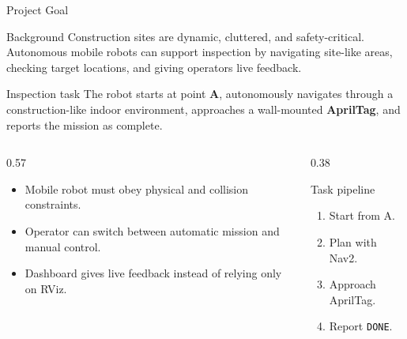 \documentclass[aspectratio=169,11pt]{beamer}
\newcommand{\topic}[1]{\textcolor{siteblue}{\textbf{#1}}}
\begin{document}
\begin{frame}{Project Goal}
  \small
  \begin{block}{Background}
    Construction sites are dynamic, cluttered, and safety-critical. Autonomous mobile robots can support inspection by navigating site-like areas, checking target locations, and giving operators live feedback.
  \end{block}

  \begin{block}{Inspection task}
    The robot starts at point \topic{A}, autonomously navigates through a construction-like indoor environment, approaches a wall-mounted \topic{AprilTag}, and reports the mission as complete.
  \end{block}

  \vspace{-0.25em}
  \begin{columns}[T,onlytextwidth]
    \begin{column}{0.57\textwidth}
      \begin{itemize}
        \item Mobile robot must obey physical and collision constraints.
        \item Operator can switch between automatic mission and manual control.
        \item Dashboard gives live feedback instead of relying only on RViz.
      \end{itemize}
    \end{column}
    \begin{column}{0.38\textwidth}
      \begin{block}{Task pipeline}
        \begin{enumerate}
          \item Start from A.
          \item Plan with Nav2.
          \item Approach AprilTag.
          \item Report \texttt{DONE}.
        \end{enumerate}
      \end{block}
    \end{column}
  \end{columns}
\end{frame}
\end{document}
